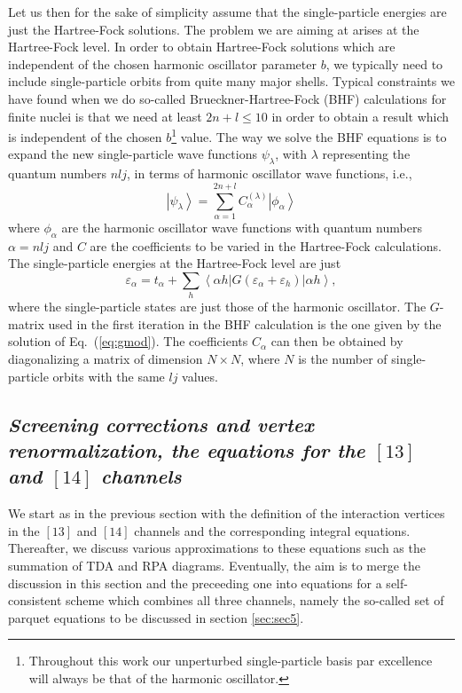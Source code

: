 \documentclass[twoside,12pt]{article}
\newcommand{\bra}[1]{\left\langle #1 \right|}
\newcommand{\ket}[1]{\left| #1 \right\rangle}
\begin{document}
Let us then for the sake of simplicity assume that the
single-particle energies are just the Hartree-Fock
solutions. The problem we are aiming at arises at the
Hartree-Fock level.
In order to obtain Hartree-Fock solutions which
are independent of the chosen harmonic oscillator
parameter $b$, we typically need to include single-particle
orbits from quite many major shells.
Typical constraints we have found when we do so-called
Brueckner-Hartree-Fock (BHF) calculations for finite nuclei is that
we need at least $2n+l \leq 10$ in order to obtain
a result which is independent of the chosen
$b$\footnote{Throughout this work our unperturbed single-particle
basis par excellence will always be that of the harmonic
oscillator.} value. The way we solve the
BHF equations is to expand the new single-particle
wave functions $\psi_{\lambda}$, with $\lambda$
representing the quantum numbers $nlj$,
in terms of harmonic oscillator wave functions,
i.e.,
\begin{equation}
     \left | \psi_{\lambda}\right\rangle=
     \sum_{\alpha =1}^{2n+l}
     C_{\alpha}^{(\lambda )}\left | \phi_{\alpha}\right\rangle
     \label{eq:selfconstbasis}
\end{equation}
where $\phi_{\alpha}$ are the harmonic oscillator wave functions
with quantum numbers $\alpha=nlj$ and $C$ are the coefficients
to be varied in the Hartree-Fock calculations.
The single-particle energies at the
Hartree-Fock level are just
\begin{equation}
  \varepsilon_{\alpha}=t_{\alpha}+
   \sum_h \bra{\alpha h} G(\varepsilon_{\alpha}+
                           \varepsilon_h)
          \ket{\alpha h},
\end{equation}
where the single-particle states are just those
of the harmonic oscillator. The $G$-matrix used in the
first iteration in the BHF calculation is the one given
by the solution of Eq.\ (\ref{eq:gmod}).
The coefficients
$C_{\alpha}$ can then be obtained by diagonalizing
a matrix of dimension $N\times N$, where $N$ is the number
of single-particle orbits with the same $lj$ values.

\subsection{\it Screening corrections and vertex renormalization, the equations
for the $[13]$ and  $[14]$ channels}
\label{subsec:sec4}

We start as in the previous section with the definition of the interaction
vertices in the $[13]$ and $[14]$ channels and the corresponding
integral equations. Thereafter, we discuss various approximations
to these equations such as the summation of TDA and RPA diagrams.
Eventually, the aim is to merge the discussion in this section and
the preceeding one into equations for a self-consistent scheme which combines
all three channels, namely the so-called set of parquet equations to
be discussed in section \ref{sec:sec5}.
\end{document}
